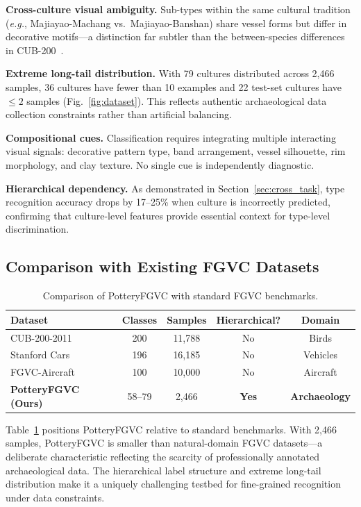 \documentclass[10pt,twocolumn,letterpaper]{article}
\begin{document}
\textbf{Cross-culture visual ambiguity.} Sub-types within the same cultural tradition (\emph{e.g.}, Majiayao-Machang vs.\ Majiayao-Banshan) share vessel forms but differ in decorative motifs---a distinction far subtler than the between-species differences in CUB-200~\cite{wah2011caltech}.

\textbf{Extreme long-tail distribution.} With 79 cultures distributed across 2,466 samples, 36 cultures have fewer than 10 examples and 22 test-set cultures have $\leq 2$ samples (Fig.~\ref{fig:dataset}). This reflects authentic archaeological data collection constraints rather than artificial balancing.

\textbf{Compositional cues.} Classification requires integrating multiple interacting visual signals: decorative pattern type, band arrangement, vessel silhouette, rim morphology, and clay texture. No single cue is independently diagnostic.

\textbf{Hierarchical dependency.} As demonstrated in Section~\ref{sec:cross_task}, type recognition accuracy drops by 17--25\% when culture is incorrectly predicted, confirming that culture-level features provide essential context for type-level discrimination.

\subsection{Comparison with Existing FGVC Datasets}

\begin{table}[t]
\centering
\caption{Comparison of PotteryFGVC with standard FGVC benchmarks.}
\label{tab:dataset_comparison}
\small
\begin{tabular}{lcccc}
\toprule
Dataset & Classes & Samples & Hierarchical? & Domain \\
\midrule
CUB-200-2011~\cite{wah2011caltech} & 200 & 11,788 & No & Birds \\
Stanford Cars~\cite{krause2013collecting} & 196 & 16,185 & No & Vehicles \\
FGVC-Aircraft~\cite{maji2013fine} & 100 & 10,000 & No & Aircraft \\
\textbf{PotteryFGVC (Ours)} & 58--79 & 2,466 & \textbf{Yes} & \textbf{Archaeology} \\
\bottomrule
\end{tabular}
\end{table}

Table~\ref{tab:dataset_comparison} positions PotteryFGVC relative to standard benchmarks. With 2,466 samples, PotteryFGVC is smaller than natural-domain FGVC datasets---a deliberate characteristic reflecting the scarcity of professionally annotated archaeological data. The hierarchical label structure and extreme long-tail distribution make it a uniquely challenging testbed for fine-grained recognition under data constraints.
\end{document}
